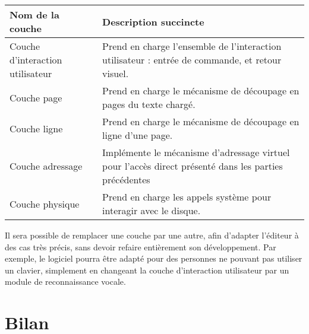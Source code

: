 \begin{center}
    \begin{tabular}{l|p{7cm}}
	Nom de la couche & Description succincte \\
	\hline \hline
	Couche d'interaction utilisateur & Prend en charge l'ensemble de
	l'interaction utilisateur : entrée de commande, et retour visuel.\\
	\hline
	Couche page & Prend en charge le mécanisme de découpage en pages du
	texte chargé.\\
	\hline
	Couche ligne & Prend en charge le mécanisme de découpage en ligne d'une
	page.\\
	\hline
	Couche adressage & Implémente le mécanisme d'adressage virtuel pour
	l'accès direct présenté dans les parties précédentes\\
	\hline
	Couche physique & Prend en charge les appels système pour interagir
	avec le disque.\\
	\hline
    \end{tabular}
\end{center}

Il sera possible de remplacer une couche par une autre, afin d'adapter
l'éditeur à des cas très précis, sans devoir refaire entièrement son
développement. Par exemple, le logiciel pourra être adapté pour des personnes
ne pouvant pas utiliser un clavier, simplement en changeant la couche
d'interaction utilisateur par un module de reconnaissance vocale.


\section{Bilan}
